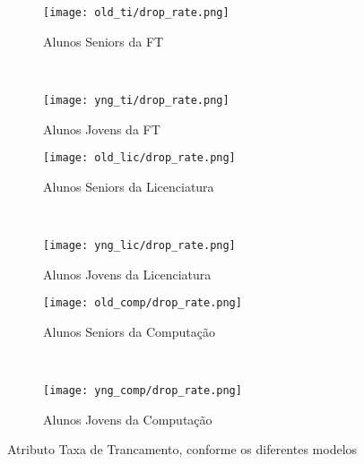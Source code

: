 \clearpage
\begin{figure}[!ht]
    \centering
    \begin{subfigure}[b]{0.48\textwidth}
        \centering
        \texttt{[image: old\_ti/drop\_rate.png]}
        \caption{Alunos Seniors da FT}
    \end{subfigure}
    ~
    \begin{subfigure}[b]{0.48\textwidth}
        \centering
        \texttt{[image: yng\_ti/drop\_rate.png]}
        \caption{Alunos Jovens da FT}
    \end{subfigure}

    \begin{subfigure}[b]{0.48\textwidth}
        \centering
        \texttt{[image: old\_lic/drop\_rate.png]}
        \caption{Alunos Seniors da Licenciatura}
    \end{subfigure}
    ~
    \begin{subfigure}[b]{0.48\textwidth}
        \centering
        \texttt{[image: yng\_lic/drop\_rate.png]}
        \caption{Alunos Jovens da Licenciatura}
    \end{subfigure}

    \begin{subfigure}[b]{0.48\textwidth}
        \centering
        \texttt{[image: old\_comp/drop\_rate.png]}
        \caption{Alunos Seniors da Computação}
    \end{subfigure}
    ~
    \begin{subfigure}[b]{0.48\textwidth}
        \centering
        \texttt{[image: yng\_comp/drop\_rate.png]}
        \caption{Alunos Jovens da Computação}
    \end{subfigure}
    \caption{Atributo Taxa de Trancamento, conforme os diferentes modelos}
\end{figure}

